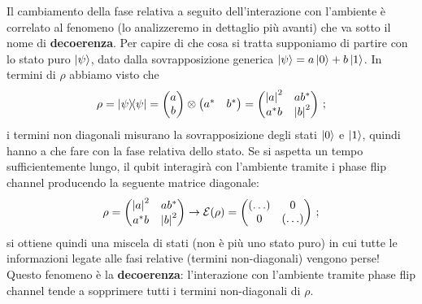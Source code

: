 \noindent Il cambiamento della fase relativa a seguito dell'interazione con l'ambiente è correlato al fenomeno (lo analizzeremo in dettaglio più avanti) che va sotto il nome di \textbf{decoerenza}. Per capire di che cosa si tratta supponiamo di partire con lo stato puro $\ket{\psi}$, dato dalla sovrapposizione generica $\ket{\psi} = a \ket{0} + b \ket{1}$. In termini di $\rho$ abbiamo visto che
\begin{equation*}
    \rho = \ketbra{\psi} =
    \begin{pmatrix}
        a \\ b
    \end{pmatrix}
    \otimes \begin{pmatrix} a^\ast & b^\ast \end{pmatrix} =
    \begin{pmatrix}
        \abs{a}^2 & a b^\ast \\ a^\ast b& \abs{b}^2
    \end{pmatrix} \, ;
\end{equation*}
i termini non diagonali misurano la sovrapposizione degli stati $\ket{0}$ e $\ket{1}$, quindi hanno a che fare con la fase relativa dello stato. Se si aspetta un tempo sufficientemente lungo, il qubit interagirà con l'ambiente tramite i phase flip channel producendo la seguente matrice diagonale:
\begin{equation*}
    \rho = 
    \begin{pmatrix}
        \abs{a}^2 & a b^\ast \\ a^\ast b& \abs{b}^2
    \end{pmatrix}
    \rightarrow
    \mathcal{E}(\rho) =
    \begin{pmatrix}
        (\ldots) & 0 \\ 0 & (\ldots)
    \end{pmatrix} \, ;
\end{equation*}
si ottiene quindi una miscela di stati (non è più uno stato puro) in cui tutte le informazioni legate alle fasi relative (termini non-diagonali) vengono perse! Questo fenomeno è la \textbf{decoerenza}: l'interazione con l'ambiente tramite phase flip channel tende a sopprimere tutti i termini non-diagonali di $\rho$. 

